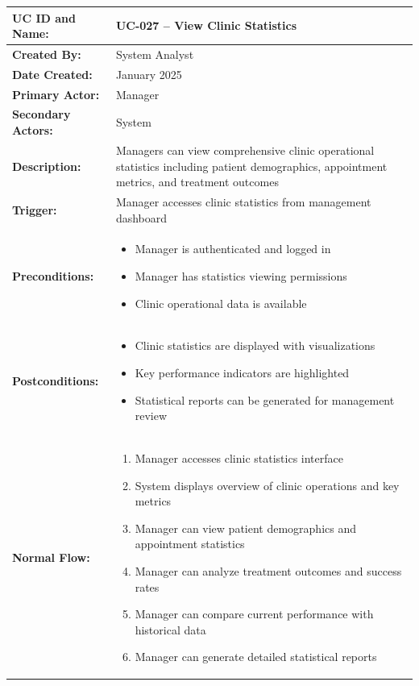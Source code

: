 \documentclass[12pt,a4paper]{article}
\begin{document}
\renewcommand{\arraystretch}{1.5}
\begin{longtable}{|p{4.5cm}|p{10.5cm}|}
\hline
\textbf{UC ID and Name:} & UC-027 – View Clinic Statistics \\
\hline
\textbf{Created By:} & System Analyst \\
\hline
\textbf{Date Created:} & January 2025 \\
\hline
\textbf{Primary Actor:} & Manager \\
\hline
\textbf{Secondary Actors:} & System \\
\hline
\textbf{Description:} & Managers can view comprehensive clinic operational statistics including patient demographics, appointment metrics, and treatment outcomes \\
\hline
\textbf{Trigger:} & Manager accesses clinic statistics from management dashboard \\
\hline
\textbf{Preconditions:} &
\begin{itemize}
  \item Manager is authenticated and logged in
  \item Manager has statistics viewing permissions
  \item Clinic operational data is available
\end{itemize} \\
\hline
\textbf{Postconditions:} &
\begin{itemize}
  \item Clinic statistics are displayed with visualizations
  \item Key performance indicators are highlighted
  \item Statistical reports can be generated for management review
\end{itemize} \\
\hline
\textbf{Normal Flow:} &
\begin{enumerate}
  \item Manager accesses clinic statistics interface
  \item System displays overview of clinic operations and key metrics
  \item Manager can view patient demographics and appointment statistics
  \item Manager can analyze treatment outcomes and success rates
  \item Manager can compare current performance with historical data
  \item Manager can generate detailed statistical reports
\end{enumerate} \\

\end{longtable}
\end{document}
